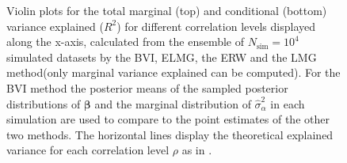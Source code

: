 \begin{figure}[H]
  \centering
  \hfill
  \caption[Marginal and conditional $R^2$ in Gaussian LMM]{Violin plots for the total marginal (top) and conditional (bottom) variance explained ($R^2$) for different correlation levels displayed along the x-axis, calculated from the ensemble of $N_{\text{sim}}=10^4$ simulated datasets by the BVI, ELMG, the ERW and the LMG method(only marginal variance explained can be computed). For the BVI method the posterior means of the sampled posterior distributions of $\boldsymbol{\beta}$ and the marginal distribution of $\hat{\sigma}^2_{\alpha}$ in each simulation are used to compare to the point estimates of the other two methods. The horizontal lines display the theoretical explained variance for each correlation level $\rho$ as in .}
  \label{fig:total_variance}
\end{figure}


